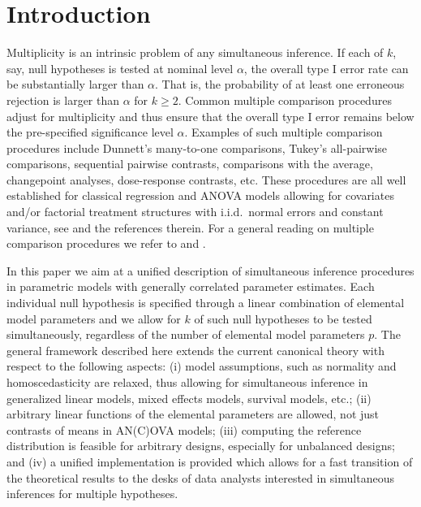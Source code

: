 \documentclass[bimj,fleqn]{w-art}
\begin{document}
\maketitle

\section{Introduction}

Multiplicity is an intrinsic problem of any simultaneous inference. If each
of $k$, say, null hypotheses is tested at nominal level $\alpha$, the
overall type I error rate can be substantially larger than $\alpha$. That
is, the probability of at least one erroneous rejection is larger than $%
\alpha$ for $k \geq 2$. Common multiple comparison procedures adjust for
multiplicity and thus ensure that the overall type I error remains below the
pre-specified significance level $\alpha$. Examples of such multiple
comparison procedures include Dunnett's many-to-one comparisons, Tukey's
all-pairwise comparisons, sequential pairwise contrasts, comparisons with
the average, changepoint analyses, dose-response contrasts, etc. These
procedures are all well established for classical regression and ANOVA
models allowing for covariates and/or factorial treatment structures with
i.i.d.~normal errors and constant variance, see \cite{Bretzetal2008} and the
references therein. For a general reading on multiple comparison procedures
we refer to \cite{HochbergTamhane1987} and \cite{Hsu1996}.

In this paper we aim at a unified description of simultaneous inference
procedures in parametric models with generally correlated parameter
estimates. Each individual null hypothesis is specified through a linear
combination of elemental model parameters and we allow for $k$ of such null
hypotheses to be tested simultaneously, regardless of the number of 
elemental model parameters $p$. The general framework described here
extends the current canonical theory with respect to the following aspects:
(i) model assumptions, such as normality and homoscedasticity are relaxed,
thus allowing for simultaneous inference in generalized linear models,
mixed effects models, survival models, etc.; (ii) arbitrary linear functions
of the elemental parameters are allowed, not just contrasts of means in AN(C)OVA
models; (iii) computing the reference distribution is feasible for arbitrary
designs, especially for unbalanced designs; and (iv) a unified implementation is
provided which allows for a fast transition of the theoretical results to
the desks of data analysts interested in simultaneous inferences for
multiple hypotheses.
\end{document}
